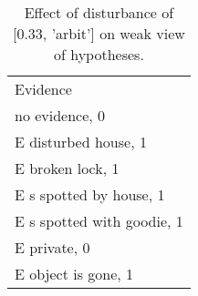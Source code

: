 \begin{table}\begin{tabular}{l}\toprule\multirow{2}{*}{Evidence} \\\\\midrule
no evidence, 0 & \\E disturbed house, 1 & \\E broken lock, 1 & \\E s spotted by house, 1 & \\E s spotted with goodie, 1 & \\E private, 0 & \\E object is gone, 1 & \\\bottomrule\end{tabular}\caption{Effect of disturbance of [0.33, 'arbit'] on weak view of hypotheses.}\end{table}